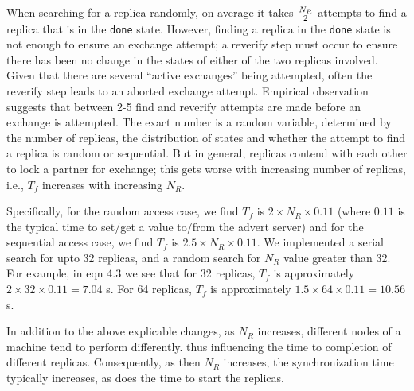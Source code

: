 \documentclass{rspublic}
\begin{document}
When searching for a replica randomly, on average it takes $N_R \over
2$ attempts to find a replica that is in the \texttt{done} state.
However, finding a replica in the \texttt{done} state is not enough to
ensure an exchange attempt; a reverify step must occur to ensure there
has been no change in the states of either of the two replicas
involved. Given that there are several ``active exchanges'' being
attempted, often the reverify step leads to an aborted exchange
attempt. Empirical observation suggests that between 2-5 find and
reverify attempts are made before an exchange is attempted. The exact
number is a random variable, determined by the number of replicas, the
distribution of states and whether the attempt to find a replica is
random or sequential. But in general, replicas contend with each other
to lock a partner for exchange; this gets worse with increasing number
of replicas, i.e., $T_f$ increases with increasing $N_R$.

Specifically, for the random access case, we find $T_f$ is $2 \times
N_R \times 0.11$ (where $0.11$ is the typical time to set/get a value
to/from the advert server) and for the sequential access case, we find
$T_f$ is $2.5 \times N_R \times 0.11$.  We implemented a serial search
for upto 32 replicas, and a random search for $N_R$ value greater than
32.
For example, in eqn 4.3 we see that for 32 replicas, $T_f$ is
approximately $2 \times 32 \times 0.11 = 7.04$ s. For 64
replicas, $T_f$ is approximately $1.5 \times 64 \times 0.11 = 10.56$
s. %

In addition to the above explicable changes, as $N_R$ increases,
different nodes of a machine tend to perform differently.  thus
influencing the time to completion of different replicas.
Consequently, as then $N_R$ increases, the synchronization time
typically increases, as does the time to start the replicas.



\end{document}
